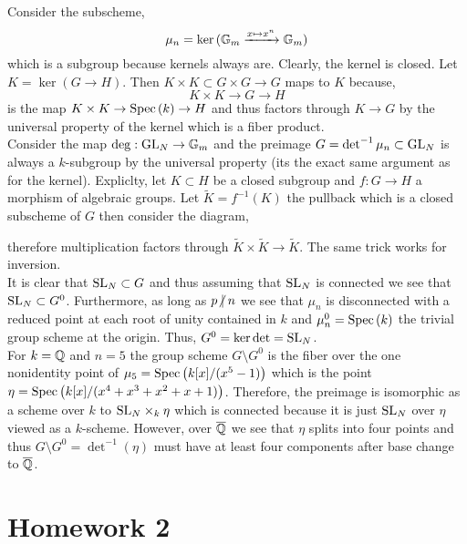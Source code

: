 \documentclass[12pt]{article}
\begin{document}
Consider the subscheme,
\[ \mu_n = \ker{(\mathbb{G}_m\xrightarrow{x \mapsto x^n} \mathbb{G}_m)} \]
which is a subgroup because kernels always are. Clearly, the kernel is closed. Let $K = \ker{(G \to H)}$. Then $K \times K \subset G \times G \to G$ maps to $K$ because,
\[ K \times K \to G \to H \]
is the map $K \times K \to \mathrm{Spec}\left( k \right) \to H$ and thus factors through $K \to G$ by the universal property of the kernel which is a fiber product. 
\bigskip\\
Consider the map $\deg : \mathrm{GL}_N \to \mathbb{G}_m$ and the preimage $G = \det^{-1}{\mu_n} \subset \mathrm{GL}_N$ is always a $k$-subgroup by the universal property (its the exact same argument as for the kernel). Expliclty, let $K \subset H$ be a closed subgroup and $f : G \to H$ a morphism of algebraic groups. Let $\tilde{K} = f^{-1}(K)$ the pullback which is a closed subscheme of $G$ then consider the diagram,
\begin{center}
\end{center}
therefore multiplication factors through $\tilde{K} \times \tilde{K} \to \tilde{K}$. The same trick works for inversion. 
\bigskip\\
It is clear that $\mathrm{SL}_N \subset G$ and thus assuming that $\mathrm{SL}_N$ is connected we see that $\mathrm{SL}_N \subset G^0$. Furthermore, as long as $p \ndivides n$ we see that $\mu_n$ is disconnected with a reduced point at each root of unity contained in $k$ and $\mu_n^0 = \mathrm{Spec}\left( k \right)$ the trivial group scheme at the origin. Thus, $G^0 = \ker{\det} = \mathrm{SL}_N$. 
\bigskip\\
For $k = \mathbb{Q}$ and $n = 5$ the group scheme $G \setminus G^0$ is the fiber over the one nonidentity point of $\mu_5 = \mathrm{Spec}\left( k[x]/(x^5 - 1) \right)$ which is the point $\eta = \mathrm{Spec}\left( k[x]/(x^4 + x^3 + x^2 + x + 1) \right)$. Therefore, the preimage is isomorphic as a scheme over $k$ to $\mathrm{SL}_N \times_k \eta$ which is connected because it is just $\mathrm{SL}_N$ over $\eta$ viewed as a $k$-scheme. However, over $\overline{\mathbb{Q}}$ we see that $\eta$ splits into four points and thus $G \setminus G^0 = \det^{-1}(\eta)$ must have at least four components after base change to $\overline{\mathbb{Q}}$.

\section{Homework 2}
\end{document}
